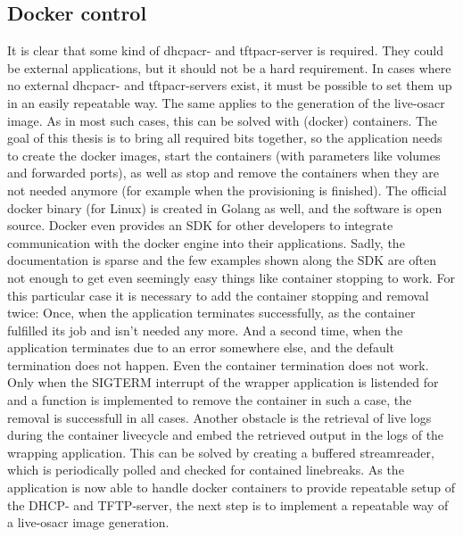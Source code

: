 \subsection{Docker control}
It is clear that some kind of \gls{dhcpacr}- and \gls{tftpacr}-server is required. They could be external applications, but it should not be a hard requirement. In cases where no external \gls{dhcpacr}- and \gls{tftpacr}-servers exist, it must be possible to set them up in an easily repeatable way. The same applies to the generation of the live-\gls{osacr} image. As in most such cases, this can be solved with (docker) containers. The goal of this thesis is to bring all required bits together, so the application needs to create the docker images, start the containers (with parameters like volumes and forwarded ports), as well as stop and remove the containers when they are not needed anymore (for example when the provisioning is finished).
\newline
The official docker binary (for Linux) is created in Golang as well, and the software is open source. Docker even provides an SDK for other developers to integrate communication with the docker engine into their applications.
Sadly, the documentation is sparse and the few examples shown along the SDK are often not enough to get even seemingly easy things like container stopping to work. For this particular case it is necessary to add the container stopping and removal twice: Once, when the application terminates successfully, as the container fulfilled its job and isn't needed any more. And a second time, when the application terminates due to an error somewhere else, and the default termination does not happen. Even  the container termination does not work. Only when the SIGTERM interrupt of the wrapper application is  listended for and a function is implemented to remove the container in such a case, the removal is successfull in all cases.
\newline
Another obstacle is the retrieval of live logs during the container livecycle and embed the retrieved output in the logs of the wrapping application. This can be solved by creating a buffered streamreader, which is periodically polled and checked for contained linebreaks.
\newline
As the application is now able to handle docker containers to provide repeatable setup of the DHCP- and TFTP-server, the next step is to implement a repeatable way of a live-\gls{osacr} image generation.

